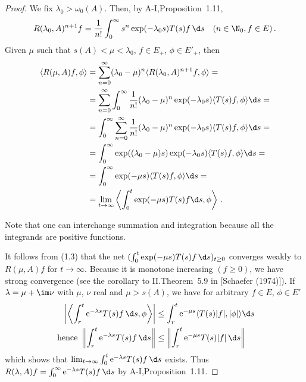 \begin{proof}
	We fix $\lambda_{0} > \omega_0(A)$.
	Then, by A-I,Proposition~1.11,
	\begin{equation}\label{eq:c3-1.2}
		R(\lambda_{0},A)^{n+1}f = \frac{1}{n!} \int_{0}^{\infty} s^n \exp(-\lambda_{0}s) T(s)f \,\d s \quad (n \in \N_{0}, f \in E)\,.
	\end{equation}
	Given $\mu$ such that $s(A) < \mu < \lambda_{0}$, $f \in E_{+}$, $\phi \in E'_{+}$, then
	\begin{equation}\label{eq:c3-1.3}
	\begin{aligned}
		\langle R(\mu,A)f,\phi\rangle &= \sum_{n=0}^{\infty} (\lambda_{0}-\mu)^n\langle R(\lambda_{0},A)^{n+1}f,\phi\rangle = \\
		&= \sum_{n=0}^{\infty} \int_{0}^{\infty} \frac{1}{n!}(\lambda_{0}-\mu)^n\exp(-\lambda_{0}s)\langle T(s)f,\phi\rangle\d s = \\
		&= \int_{0}^{\infty} \sum_{n=0}^{\infty} \frac{1}{n!}(\lambda_{0}-\mu)^n\exp(-\lambda_{0}s)\langle T(s)f,\phi\rangle\d s = \\
		&= \int_{0}^{\infty} \exp((\lambda_{0}-\mu)s)\exp(-\lambda_{0}s)\langle T(s)f,\phi\rangle\d s = \\
		&= \int_{0}^{\infty} \exp(-\mu s)\langle T(s)f,\phi\rangle\d s = \\ & = \lim_{t\to\infty}\left\langle \int_{0}^t \exp(-\mu s)T(s)f \d s,\phi\right\rangle\,.
	\end{aligned}
	\end{equation}
	
	Note that one can interchange summation and integration because all the integrands are positive functions.
	
	It follows from (1.3) that the net $(\int_{0}^t \exp(-\mu s)T(s) f \,\d s)_{t\geq 0}$ converges weakly to $R(\mu,A)f$ for $t \to \infty$.
	Because it is monotone increasing $(f \geq 0)$, we have strong convergence (see the corollary to II.Theorem~5.9 in [Schaefer (1974)]).
%
%
If $\lambda = \mu + \im\nu$ with $\mu$, $\nu$ real and $\mu > s(A)$, we have for arbitrary $f \in E$, $\phi \in E'$
\begin{align*}
	\left|\left\langle \int_{r}^t \mathrm{e}^{-\lambda s}T(s)f \,\d s,\phi\right\rangle\right| &\leq \int_{r}^t \mathrm{e}^{-\mu s}\langle T(s)|f|,|\phi|\rangle\d s \\
	\text{ hence } \left\|\int_{r}^t \mathrm{e}^{-\lambda s}T(s)f \,\d s\right\| &\leq \left\|\int_{r}^t \mathrm{e}^{-\mu s}T(s)|f| \,\d s\right\| \
\end{align*}
which shows that $\lim_{t\to\infty} \int_{0}^t \mathrm{e}^{-\lambda s}T(s)f \,\d s$ exists.
Thus $R(\lambda,A)f = \int_{0}^{\infty} \mathrm{e}^{-\lambda s} T(s)f \,\d s$ by A-I,Proposition~1.11.


\end{proof}
